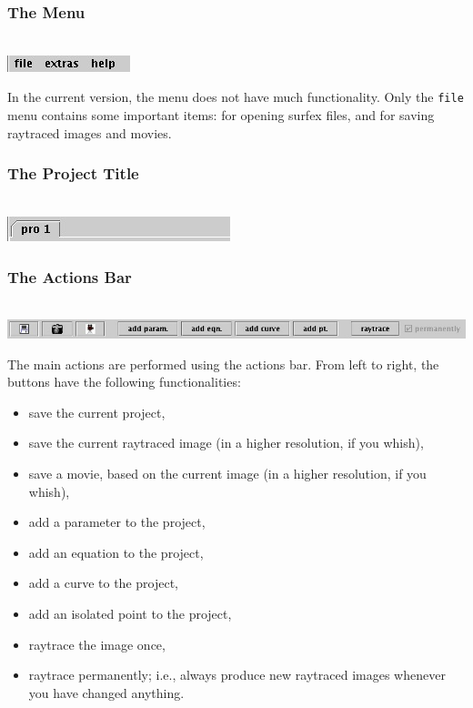 \documentclass{article}
\newcommand{\surfex}{{\sc surfex}}
\begin{document}
%
\subsubsection{The Menu}

\ \\\includegraphics[scale=0.75]{surfex_menu_bar}

In the current version, the menu does not have much functionality.
Only the {\tt file} menu contains some important items:
for opening \surfex{} files, and for saving raytraced images and movies.

%
\subsubsection{The Project Title}

\ \\\includegraphics[scale=0.6]{surfex_project_title}


%
\subsubsection{The Actions Bar}

\ \\\includegraphics[scale=0.35]{surfex_actions_bar}

The main actions are performed using the actions bar.
From left to right, the buttons have the following functionalities:
\begin{itemize}
\item save the current project,
\item save the current raytraced image (in a higher resolution, if you whish),
\item save a movie, based on the current image (in a higher resolution, if you whish),
\item add a parameter to the project,
\item add an equation to the project,
\item add a curve to the project,
\item add an isolated point to the project,
\item raytrace the image once,
\item raytrace permanently; i.e., always produce new raytraced images whenever
  you have changed anything.
\end{itemize}
\end{document}
